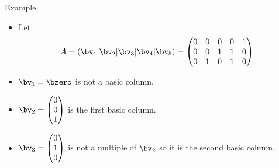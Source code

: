\documentclass{beamer}
\begin{document}
\begin{frame}{Example}

\begin{itemize}
\item Let
$$A = \left(\bv_1 \vert \bv_2 \vert \bv_3 \vert \bv_4 \vert \bv_5 \right) =
\begin{pmatrix}
0 & 0 & 0 & 0 & 1 \\
0 & 0 & 1 & 1 & 0 \\
0 & 1 & 0 & 1 & 0 \\
\end{pmatrix}.
$$
\item $\bv_1 = \bzero$ is not a basic column.
\item $\bv_2
=
\begin{pmatrix}
0 \\
0 \\
1 \\
\end{pmatrix}
$
is the first basic column.
\item $\bv_3 =
\begin{pmatrix}
0 \\
1 \\
0 \\
\end{pmatrix}
$
is not a multiple of $\bv_2$ so it is the second basic column.
\end{itemize}

\end{frame}

\end{document}
